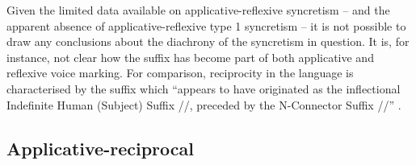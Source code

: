 \newpage

Given the limited data available on applicative-reflexive syncretism -- and the apparent absence of applicative-reflexive type 1 syncretism -- it is not possible to draw any conclusions about the diachrony of the syncretism in question. It is, for instance, not clear how the  suffix  has become part of both applicative and reflexive voice marking. For comparison, reciprocity in the language is characterised by the suffix  which “appears to have originated as the inflectional Indefinite Human (Subject) Suffix //, preceded by the N-Connector Suffix //” \citep[376]{morgan:1991}.

\subsection{Applicative-reciprocal} \label{sec:simple-syncretism:appl-recp}

